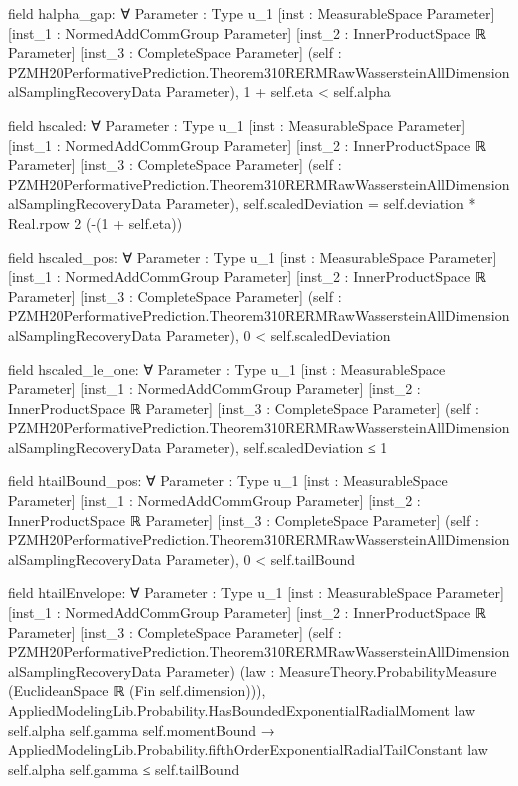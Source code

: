 \documentclass[10pt]{article}
\begin{document}
\begin{ReviewVerbatim}
field halpha_gap:
∀ {Parameter : Type u_1} [inst : MeasurableSpace Parameter] [inst_1 : NormedAddCommGroup Parameter]
  [inst_2 : InnerProductSpace ℝ Parameter] [inst_3 : CompleteSpace Parameter]
  (self : PZMH20PerformativePrediction.Theorem310RERMRawWassersteinAllDimensionalSamplingRecoveryData Parameter),
  1 + self.eta < self.alpha

field hscaled:
∀ {Parameter : Type u_1} [inst : MeasurableSpace Parameter] [inst_1 : NormedAddCommGroup Parameter]
  [inst_2 : InnerProductSpace ℝ Parameter] [inst_3 : CompleteSpace Parameter]
  (self : PZMH20PerformativePrediction.Theorem310RERMRawWassersteinAllDimensionalSamplingRecoveryData Parameter),
  self.scaledDeviation = self.deviation * Real.rpow 2 (-(1 + self.eta))

field hscaled_pos:
∀ {Parameter : Type u_1} [inst : MeasurableSpace Parameter] [inst_1 : NormedAddCommGroup Parameter]
  [inst_2 : InnerProductSpace ℝ Parameter] [inst_3 : CompleteSpace Parameter]
  (self : PZMH20PerformativePrediction.Theorem310RERMRawWassersteinAllDimensionalSamplingRecoveryData Parameter),
  0 < self.scaledDeviation

field hscaled_le_one:
∀ {Parameter : Type u_1} [inst : MeasurableSpace Parameter] [inst_1 : NormedAddCommGroup Parameter]
  [inst_2 : InnerProductSpace ℝ Parameter] [inst_3 : CompleteSpace Parameter]
  (self : PZMH20PerformativePrediction.Theorem310RERMRawWassersteinAllDimensionalSamplingRecoveryData Parameter),
  self.scaledDeviation ≤ 1

field htailBound_pos:
∀ {Parameter : Type u_1} [inst : MeasurableSpace Parameter] [inst_1 : NormedAddCommGroup Parameter]
  [inst_2 : InnerProductSpace ℝ Parameter] [inst_3 : CompleteSpace Parameter]
  (self : PZMH20PerformativePrediction.Theorem310RERMRawWassersteinAllDimensionalSamplingRecoveryData Parameter),
  0 < self.tailBound

field htailEnvelope:
∀ {Parameter : Type u_1} [inst : MeasurableSpace Parameter] [inst_1 : NormedAddCommGroup Parameter]
  [inst_2 : InnerProductSpace ℝ Parameter] [inst_3 : CompleteSpace Parameter]
  (self : PZMH20PerformativePrediction.Theorem310RERMRawWassersteinAllDimensionalSamplingRecoveryData Parameter)
  (law : MeasureTheory.ProbabilityMeasure (EuclideanSpace ℝ (Fin self.dimension))),
  AppliedModelingLib.Probability.HasBoundedExponentialRadialMoment law self.alpha self.gamma self.momentBound →
    AppliedModelingLib.Probability.fifthOrderExponentialRadialTailConstant law self.alpha self.gamma ≤ self.tailBound


\end{ReviewVerbatim}
\end{document}
